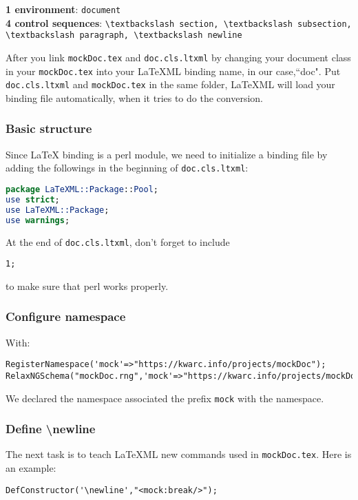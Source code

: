 \documentclass[a4paper]{article}
\def\latexml{{\LaTeX}ML\xspace}
\begin{document}
\textbf{1 environment}: \lstinline|document|\\
\indent \textbf{4 control sequences}: \lstinline|\textbackslash section, \textbackslash subsection, \textbackslash paragraph, \textbackslash newline|

After you link \lstinline|mockDoc.tex| and \lstinline|doc.cls.ltxml| by changing your
document class in your \lstinline|mockDoc.tex| into your \latexml binding name, in our
case,``doc". Put \lstinline|doc.cls.ltxml| and \lstinline|mockDoc.tex| in the same folder,
\latexml will load your binding file automatically, when it tries to do the conversion.

\subsubsection{Basic structure}
Since {\LaTeX} binding is a perl module, we need to initialize a binding file by adding
the followings in the beginning of \lstinline|doc.cls.ltxml|:
\begin{lstlisting}[language=Perl]
package LaTeXML::Package::Pool;
use strict;
use LaTeXML::Package;
use warnings;
\end{lstlisting}
At the end of \lstinline|doc.cls.ltxml|, don't forget to include
\begin{lstlisting}
1;
\end{lstlisting}
to make sure that perl works properly.

\subsubsection{Configure namespace}
 With:
\begin{lstlisting}
RegisterNamespace('mock'=>"https://kwarc.info/projects/mockDoc");
RelaxNGSchema("mockDoc.rng",'mock'=>"https://kwarc.info/projects/mockDoc");
\end{lstlisting}
We declared the namespace associated the prefix \lstinline|mock| with the namespace.

\subsubsection{Define \textbackslash newline}
 The next task is to teach \latexml new commands used in \lstinline|mockDoc.tex|. Here is an example:
\begin{lstlisting}
DefConstructor('\newline',"<mock:break/>");
\end{lstlisting}
\end{document}
